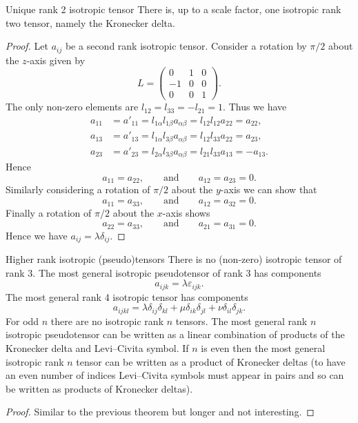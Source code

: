 \begin{theorem}{Unique rank 2 isotropic tensor}{}
    There is, up to a scale factor, one isotropic rank two tensor, namely the Kronecker delta.
\end{theorem}
\begin{proof}
    Let \(a_{ij}\) be a second rank isotropic tensor.
    Consider a rotation by \(\pi/2\) about the \(z\)-axis given by
    \[
    L =
    \begin{pmatrix}
        0 & 1 & 0\\
        -1 & 0 & 0\\
        0 & 0 & 1
    \end{pmatrix}
    .
    \]
    The only non-zero elements are \(l_{12} = l_{33} = -l_{21} = 1\).
    Thus we have
    \begin{align*}
        a_{11} &= a'_{11} = l_{1\alpha}l_{1\beta}a_{\alpha\beta} = l_{12}l_{12}a_{22} = a_{22},\\
        a_{13} &= a'_{13} = l_{1\alpha}l_{3\beta}a_{\alpha\beta} = l_{12}l_{33}a_{22} = a_{23},\\
        a_{23} &= a'_{23} = l_{2\alpha}l_{3\beta}a_{\alpha\beta} = l_{21}l_{33}a_{13} = -a_{13}.
    \end{align*}
    Hence
    \[a_{11} = a_{22}, \qquad\text{and}\qquad a_{12} = a_{23} = 0.\]
    Similarly considering a rotation of \(\pi/2\) about the \(y\)-axis we can show that 
    \[a_{11} = a_{33}, \qquad\text{and}\qquad a_{12} = a_{32} = 0.\]
    Finally a rotation of \(\pi/2\) about the \(x\)-axis shows
    \[a_{22} = a_{33}, \qquad\text{and}\qquad a_{21} = a_{31} = 0.\]
    Hence we have \(a_{ij} = \lambda \delta_{ij}\).
\end{proof}

\begin{theorem}{Higher rank isotropic (pseudo)tensors}{}
    There is no (non-zero) isotropic tensor of rank 3.
    The most general isotropic pseudotensor of rank 3 has components
    \[a_{ijk} = \lambda \varepsilon_{ijk}.\]
    The most general rank 4 isotropic tensor has components
    \[a_{ijkl} = \lambda\delta_{ij}\delta_{kl} + \mu\delta_{ik}\delta_{jl} + \nu\delta_{il}\delta_{jk}.\]
    For odd \(n\) there are no isotropic rank \(n\) tensors.
    The most general rank \(n\) isotropic pseudotensor can be written as a linear combination of products of the Kronecker delta and Levi--Civita symbol.
    If \(n\) is even then the most general isotropic rank \(n\) tensor can be written as a product of Kronecker deltas (to have an even number of indices Levi--Civita symbols must appear in pairs and so can be written as products of Kronecker deltas).
\end{theorem} 
\begin{proof}
    Similar to the previous theorem but longer and not interesting.
    \phantom{\qedhere}  %
\end{proof}

